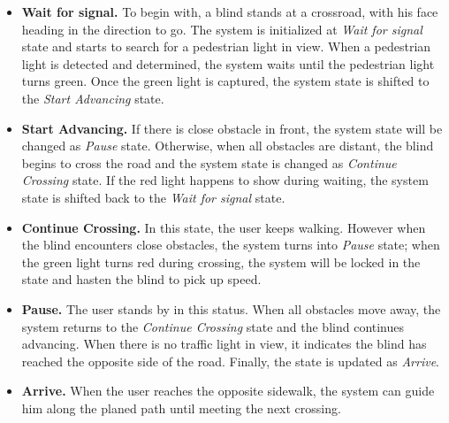 \begin{itemize}
\item \textbf{Wait for signal.} To begin with, a blind stands at a crossroad, with his face heading in the direction to go. The system is initialized at \emph{Wait for signal} state and starts to search for a pedestrian light in view. When a pedestrian light is detected and determined, the system waits until the pedestrian light turns green. Once the green light is captured, the system state is shifted to the \emph{Start Advancing} state.

\item \textbf{Start Advancing.} 
If there is close obstacle in front, the system state will be changed as \emph{Pause} state. Otherwise, when all obstacles are distant, the blind begins to cross the road and the system state is changed as \emph{Continue Crossing} state. If the red light happens to show during waiting, the system state is shifted back to the \emph{Wait for signal} state. 

\item \textbf{Continue Crossing.} In this state, the user keeps walking. However when the blind encounters close obstacles, the system turns into \emph{Pause} state; when  the green light turns red during crossing, the system will be locked in the state and hasten the blind to pick up speed. 


\item \textbf{Pause.} The user stands by in this status. When all obstacles move away, the system returns to the \emph{Continue Crossing} state and the blind continues advancing. When there is no traffic light in view, it indicates the blind has reached the opposite side of the road. Finally, the state is updated as \emph{Arrive}.

\item \textbf{Arrive.} When the user reaches the opposite sidewalk, the system can guide him along the planed path until meeting the next crossing. 
\end{itemize}



